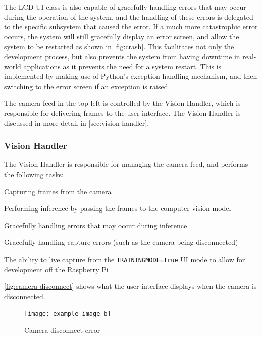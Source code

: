 The LCD UI class is also capable of gracefully handling errors that may occur during the operation of the system, and the handling of these errors is delegated to the specific subsystem that caused the error. If a much more catastrophic error occurs, the system will still gracefully display an error screen, and allow the system to be restarted as shown in \autoref{fig:crash}. This facilitates not only the development process, but also prevents the system from having downtime in real-world applications as it prevents the need for a system restart. This is implemented by making use of Python's exception handling mechanism, and then switching to the error screen if an exception is raised.

The camera feed in the top left is controlled by the Vision Handler, which is responsible for delivering frames to the user interface. The Vision Handler is discussed in more detail in \autoref{sec:vision-handler}. 

\subsubsection{Vision Handler}
\label{sec:vision-handler}
The Vision Handler is responsible for managing the camera feed, and performs the following tasks:
\begin{mylist}
    \item Capturing frames from the camera
    \item Performing inference by passing the frames to the computer vision model
    \item Gracefully handling errors that may occur during inference
    \item Gracefully handling capture errors (such as the camera being disconnected)
    \item The ability to live capture from the \texttt{TRAININGMODE=True} UI mode to allow for development off the Raspberry Pi
\end{mylist}

\autoref{fig:camera-disconnect} shows what the user interface displays when the camera is disconnected.

\begin{figure}[H]
    \hfill
    \begin{minipage}[t]{\textwidth}
      \centering
      \texttt{[image: example-image-b]}
      \caption{Camera disconnect error}
      \label{fig:camera-disconnect}
    \end{minipage}
\end{figure}


